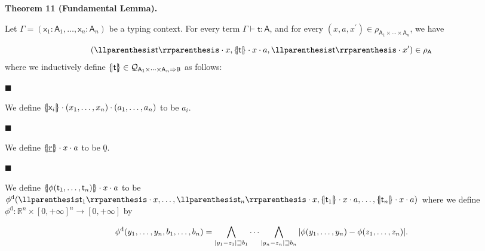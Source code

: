  
 
\par\medskip\noindent\textbf{Theorem 11 (Fundamental Lemma).}\par
 
 
Let $\mathsf{\Gamma}=(\mathsf{x}_{1}:\mathsf{A}_{1},\ldots,\mathsf{x}_{n}:\mathsf{A%
}_{n})$ be a typing context. For every term $\mathsf{\Gamma}\vdash\mathsf{t}:\mathsf{A}$, and for every $(x,a,x^{\prime})\in\rho_{\mathsf{A}_{1}\times\cdots\times\mathsf{A}_{n}}$, we have\par
    \[(\llparenthesis\mathsf{t}\rrparenthesis\cdot x,\{\hskip-2.25pt|\mathsf{t}|%
\hskip-2.25pt\}\cdot x\cdot a,\llparenthesis\mathsf{t}\rrparenthesis\cdot x^{%
\prime})\in\rho_{{\mathsf{A}}}\]    
where we inductively define $\{\hskip-2.25pt|\mathsf{t}|\hskip-2.25pt\}\in\mathcal{Q}_{\mathsf{A}_{1}\times%
\cdots\times\mathsf{A}_{n}\Rightarrow\mathsf{B}}$ as follows:\par
  
\par\noindent  $\blacksquare$ 
 
We define $\{\hskip-2.25pt|\mathsf{x}_{i}|\hskip-2.25pt\}\cdot(x_{1},\ldots,x_{n})\cdot(a%
_{1},\ldots,a_{n})$ to be $a_{i}.$\par
 
 
 
\par\noindent  $\blacksquare$ 
 
We define $\{\hskip-2.25pt|\underline{r}|\hskip-2.25pt\}\cdot x\cdot a$ to be $\underline{0}.$\par
 
 
 
\par\noindent  $\blacksquare$ 
 
We define $\{\hskip-2.25pt|\phi(\mathsf{t}_{1},\ldots,\mathsf{t}_{n})|\hskip-2.25pt\}%
\cdot x\cdot a$ to be $\phi^{\mathrm{d}}(\llparenthesis\mathsf{t}_{1}\rrparenthesis\cdot x,\ldots,%
\llparenthesis\mathsf{t}_{n}\rrparenthesis\cdot x,\{\hskip-2.25pt|\mathsf{t}_{%
1}|\hskip-2.25pt\}\cdot x\cdot a,\ldots,\{\hskip-2.25pt|\mathsf{t}_{n}|\hskip-%
2.25pt\}\cdot x\cdot a)$ where we define $\phi^{\mathrm{d}}\colon\mathbb{R}^{n}\times[0,+\infty]^{n}\to[0,+\infty]$ by\par
    \[\phi^{\mathrm{d}}(y_{1},\ldots,y_{n},b_{1},\ldots,b_{n})=\bigwedge_{|y_{1}-z_{%
1}|\sqsupseteq b_{1}}\cdots\bigwedge_{|y_{n}-z_{n}|\sqsupseteq b_{n}}|\phi(y_{%
1},\ldots,y_{n})-\phi(z_{1},\ldots,z_{n})|.\]    
 
